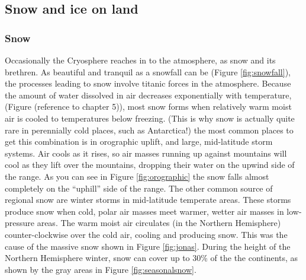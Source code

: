 \documentclass[amstex,12pt]{book}
\begin{document}
\subsection{Snow and ice on land}
\subsubsection{Snow}\label{snow_talk} Occasionally the Cryosphere reaches in to the atmosphere, as snow and its brethren. As beautiful and tranquil as a snowfall can be (Figure \ref{fig:snowfall}), the processes leading to snow involve titanic forces in the atmosphere.  Because the amount of water dissolved in air decreases exponentially with temperature, (Figure (reference to chapter 5)), most snow forms when relatively warm moist air is cooled to temperatures below freezing. (This is why snow is actually quite rare in perennially cold places, such as Antarctica!) the most common places to get this combination is in orographic uplift, and large, mid-latitude storm systems. Air cools as it rises, so air masses running up against mountains will cool as they lift over the mountains, dropping their water on the upwind side of the range. As you can see in Figure \ref{fig:orographic} the snow falls almost completely on the ``uphill'' side of the range. The other common source of regional snow are winter storms in mid-latitude temperate areas. These storms produce snow when cold, polar air masses meet warmer, wetter air masses in low-pressure areas. The warm moist air circulates (in the Northern Hemisphere) counter-clockwise over the cold air, cooling and producing snow. This was the cause of the massive snow shown in Figure \ref{fig:jonas}. During the height of the Northern Hemisphere winter, snow can cover up to 30\% of the the continents, as shown by the gray areas in Figure \ref{fig:seasonalsnow}.\\
\end{document}
